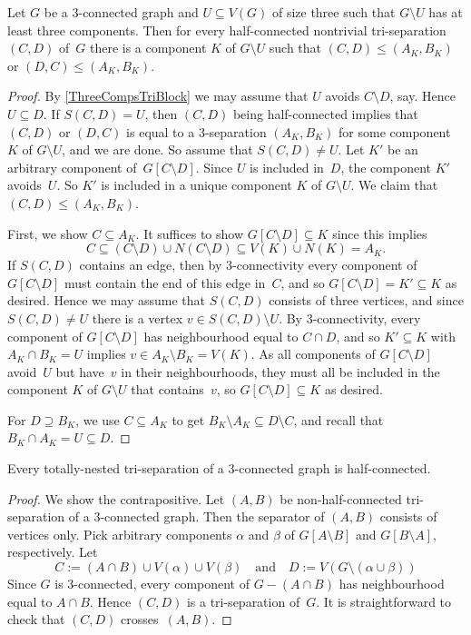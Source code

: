 \documentclass{aic}
\newcommand{\se}{\subseteq}
\theoremstyle{plain}
\theoremstyle{definition}
\theoremstyle{plain}
\theoremstyle{plain}
\newcommand{\sm}{\setminus}
\renewcommand{\le}{\leqslant}
\begin{document}
\begin{lem}\label{stuff_into_component}
Let $G$ be a 3-connected graph and $U\se V(G)$ of size three such that $G\sm U$ has at least three components.
Then for every half-connected nontrivial tri-separation $(C,D)$ of~$G$ there is a component $K$ of $G\sm U$ such that $(C,D)\le (A_K,B_K)$ or $(D,C)\le (A_K,B_K)$.
\end{lem}
\begin{proof}
By \autoref{ThreeCompsTriBlock} we may assume that $U$ avoids $C\sm D$, say.
Hence $U\se D$.
If $S(C,D)=U$, then $(C,D)$ being half-connected implies that $(C,D)$ or $(D,C)$ is equal to a 3-separation $(A_K,B_K)$ for some component $K$ of $G\sm U$, and we are done.
So assume that $S(C,D)\neq U$.
Let $K'$ be an arbitrary component of~$G[C\sm D]$.
Since $U$ is included in~$D$, the component $K'$ avoids~$U$.
So $K'$ is included in a unique component $K$ of $G\sm U$.
We claim that $(C,D)\le (A_K,B_K)$.

First, we show $C\se A_K$.
It suffices to show $G[C\sm D]\se K$ since this implies 
\[
    C\se (C\sm D)\cup N(C\sm D)\se V(K)\cup N(K) =A_K.
\]
If $S(C,D)$ contains an edge, then by 3-connectivity every component of $G[C\sm D]$ must contain the end of this edge in~$C$, and so $G[C\sm D]=K'\se K$ as desired.
Hence we may assume that $S(C,D)$ consists of three vertices, and since $S(C,D)\neq U$ there is a vertex $v\in S(C,D)\sm U$.
By 3-connectivity, every component of $G[C\sm D]$ has neighbourhood equal to $C\cap D$, and so $K'\se K$ with $A_K\cap B_K=U$ implies $v\in A_K\sm B_K=V(K)$.
As all components of $G[C\sm D]$ avoid~$U$ but have~$v$ in their neighbourhoods, they must all be included in the component $K$ of $G\sm U$ that contains~$v$, so $G[C\sm D]\se K$ as desired.

For $D\supseteq B_K$, we use $C\se A_K$ to get $B_K\sm A_K\se D\sm C$, and recall that $B_K\cap A_K=U\se D$.
\end{proof}

\begin{lem}\label{totallyNestedHalfConnected}
Every totally-nested tri-separation of a 3-connected graph is half-connected.
\end{lem}
\begin{proof}
We show the contrapositive.
Let $(A,B)$ be non-half-connected tri-separation of a 3-connected graph.
Then the separator of $(A,B)$ consists of vertices only.
Pick arbitrary components $\alpha$ and $\beta$ of $G[A\sm B]$ and $G[B\sm A]$, respectively.
Let 
\[
    C:=(A\cap B)\cup V(\alpha)\cup V(\beta) \quad\text{and}\quad D:=V(G\sm(\alpha\cup\beta))
\]
Since $G$ is 3-connected, every component of $G-(A\cap B)$ has neighbourhood equal to $A\cap B$.
Hence $(C,D)$ is a tri-separation of~$G$.
It is straightforward to check that $(C,D)$ crosses~$(A,B)$.
\end{proof}
\end{document}

